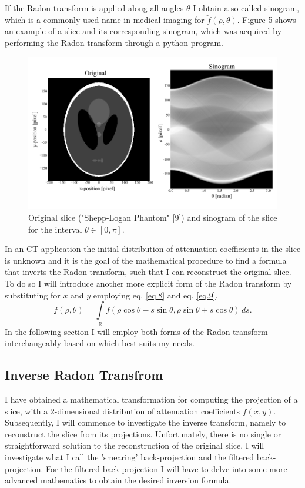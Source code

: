 \documentclass[12pt]{article}
\begin{document}
If the Radon transform is applied along all angles $\theta$ I obtain a so-called sinogram, which is a commonly used name in medical imaging for $\breve{f}(\rho, \theta)$. Figure 5 shows an example of a slice and its corresponding sinogram, which was acquired by performing the Radon transform through a python program.
\begin{figure}[hbt]
	\includegraphics[width = .7\textwidth]{theory/sinogram}
	\caption{Original slice ("Shepp-Logan Phantom" [9]) and sinogram of the slice for the interval $\theta \in [0, \pi]$.}
\end{figure}
In an CT application the initial distribution of attenuation coefficients in the slice is unknown and it is the goal of the mathematical procedure to find a formula that inverts the Radon transform, such that I can reconstruct the original slice. To do so I will introduce another more explicit form of the Radon transform by substituting for $x$ and $y$ employing  eq. \ref{eq.8} and eq. \ref{eq.9}. 
\begin{equation}\label{eq.11}
	\breve{f}(\rho, \theta)=\int\limits_{\mathbb{R}} f(\rho\cos{\theta}	 - s\sin{\theta},\rho\sin{\theta} + s\cos{\theta}) \, ds. 
\end{equation}
In the following section I will employ both forms of the Radon transform interchangeably based on which best suits my needs.

\subsection{Inverse Radon Transfrom}
I have obtained a mathematical transformation for computing the projection of a slice, with a 2-dimensional distribution of attenuation coefficients $f(x,y)$. Subsequently, I will commence to investigate the inverse transform, namely to reconstruct the slice from its projections. Unfortunately, there is no single or straightforward solution to the reconstruction of the original slice. I will investigate what I call the 'smearing' back-projection and the filtered back-projection. For the filtered back-projection I will have to delve into some more advanced mathematics to obtain the desired inversion formula.
\end{document}
